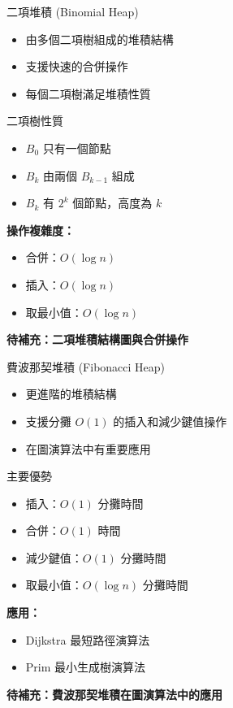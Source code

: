 \documentclass{beamer}
\begin{document}
\begin{frame}{二項堆積 (Binomial Heap)}
\begin{itemize}
    \item 由多個二項樹組成的堆積結構
    \item 支援快速的合併操作
    \item 每個二項樹滿足堆積性質
\end{itemize}

\vspace{1em}
\begin{block}{二項樹性質}
\begin{itemize}
    \item $B_0$ 只有一個節點
    \item $B_k$ 由兩個 $B_{k-1}$ 組成
    \item $B_k$ 有 $2^k$ 個節點，高度為 $k$
\end{itemize}
\end{block}

\vspace{1em}
\textbf{操作複雜度：}
\begin{itemize}
    \item 合併：$O(\log n)$
    \item 插入：$O(\log n)$
    \item 取最小值：$O(\log n)$
\end{itemize}

\vspace{1em}
\textbf{待補充：二項堆積結構圖與合併操作}
\end{frame}

\begin{frame}{費波那契堆積 (Fibonacci Heap)}
\begin{itemize}
    \item 更進階的堆積結構
    \item 支援分攤 $O(1)$ 的插入和減少鍵值操作
    \item 在圖演算法中有重要應用
\end{itemize}

\vspace{1em}
\begin{block}{主要優勢}
\begin{itemize}
    \item 插入：$O(1)$ 分攤時間
    \item 合併：$O(1)$ 時間
    \item 減少鍵值：$O(1)$ 分攤時間
    \item 取最小值：$O(\log n)$ 分攤時間
\end{itemize}
\end{block}

\vspace{1em}
\textbf{應用：}
\begin{itemize}
    \item Dijkstra 最短路徑演算法
    \item Prim 最小生成樹演算法
\end{itemize}

\vspace{1em}
\textbf{待補充：費波那契堆積在圖演算法中的應用}
\end{frame}
\end{document}
